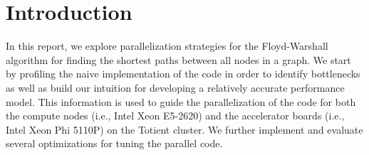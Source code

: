 
\section{Introduction}
\label{sec-intro}

In this report, we explore parallelization strategies for the
Floyd-Warshall algorithm for finding the shortest paths between all nodes
in a graph. We start by profiling the naive implementation of the code in
order to identify bottlenecks as well as build our intuition for
developing a relatively accurate performance model. This information is
used to guide the parallelization of the code for both the compute nodes
(i.e., Intel Xeon E5-2620) and the accelerator boards (i.e., Intel Xeon
Phi 5110P) on the Totient cluster. We further implement and evaluate
several optimizations for tuning the parallel code.

